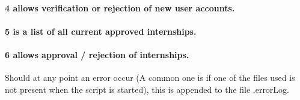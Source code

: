 \documentclass{article}
\begin{document}
\paragraph{\textmd{4 allows verification or rejection of new user accounts.}}


\paragraph{\textmd{5 is a list of all current approved internships.}}


\paragraph{\textmd{6 allows approval / rejection of internships.}}

Should at any point an error occur (A common one is if one of the
files used is not present when the script is started), this is appended
to the file .errorLog.
\end{document}
